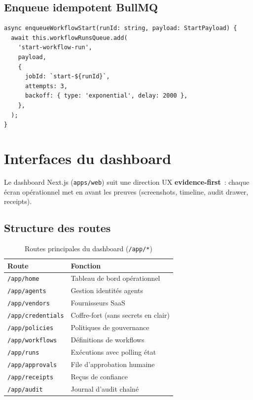 \subsection{Enqueue idempotent BullMQ}

\begin{lstlisting}[style=tsstyle,
  caption={Queue — Jobs idempotents par runId},
  label={lst:queue}]
async enqueueWorkflowStart(runId: string, payload: StartPayload) {
  await this.workflowRunsQueue.add(
    'start-workflow-run',
    payload,
    {
      jobId: `start-${runId}`,
      attempts: 3,
      backoff: { type: 'exponential', delay: 2000 },
    },
  );
}
\end{lstlisting}

\section{Interfaces du dashboard}

Le dashboard Next.js (\texttt{apps/web}) suit une direction UX
\textbf{evidence-first}~: chaque écran opérationnel met en avant les
preuves (screenshots, timeline, audit drawer, receipts).

\subsection{Structure des routes}

\begin{table}[H]
\centering
\caption{Routes principales du dashboard (\texttt{/app/*})}
\label{tab:routes}
\small
\begin{tabularx}{\textwidth}{@{}p{4.2cm}X@{}}
\toprule
\textbf{Route} & \textbf{Fonction} \\
\midrule
\rowcolor{rowgray}
\texttt{/app/home} & Tableau de bord opérationnel \\
\texttt{/app/agents} & Gestion identités agents \\
\rowcolor{rowgray}
\texttt{/app/vendors} & Fournisseurs SaaS \\
\texttt{/app/credentials} & Coffre-fort (sans secrets en clair) \\
\rowcolor{rowgray}
\texttt{/app/policies} & Politiques de gouvernance \\
\texttt{/app/workflows} & Définitions de workflows \\
\rowcolor{rowgray}
\texttt{/app/runs} & Exécutions avec polling état \\
\texttt{/app/approvals} & File d'approbation humaine \\
\rowcolor{rowgray}
\texttt{/app/receipts} & Reçus de confiance \\
\texttt{/app/audit} & Journal d'audit chaîné \\
\bottomrule
\end{tabularx}
\end{table}

